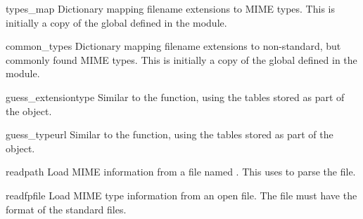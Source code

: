 \begin{memberdesc}[MimeTypes]{types_map}
  Dictionary mapping filename extensions to MIME types.  This is
  initially a copy of the global  defined in the
  module.
\end{memberdesc}

\begin{memberdesc}[MimeTypes]{common_types}
  Dictionary mapping filename extensions to non-standard, but commonly
  found MIME types.  This is initially a copy of the global
   defined in the module.
\end{memberdesc}

\begin{methoddesc}[MimeTypes]{guess_extension}{type}
  Similar to the  function, using the
  tables stored as part of the object.
\end{methoddesc}

\begin{methoddesc}[MimeTypes]{guess_type}{url}
  Similar to the  function, using the tables
  stored as part of the object.
\end{methoddesc}

\begin{methoddesc}[MimeTypes]{read}{path}
  Load MIME information from a file named .  This uses
   to parse the file.
\end{methoddesc}

\begin{methoddesc}[MimeTypes]{readfp}{file}
  Load MIME type information from an open file.  The file must have
  the format of the standard  files.
\end{methoddesc}
